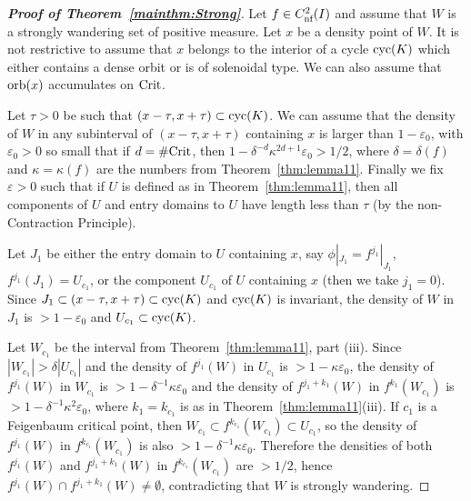 \documentclass[12pt, psamsfonts, reqno]{amsart}
\begin{document}
\begin{proof}[\textbf{Proof of Theorem~\ref{mainthm:Strong}}]
Let $f\in {C^2_{\text{\rm nf}}}(I)$ and assume that $W$ is a strongly wandering
set of positive measure. Let $x$ be a density point of $W$. It is
not restrictive to assume that $x$ belongs to the interior of a
cycle ${\mathop{\rm cyc}\nolimits}(K)$ which either contains a dense orbit \iffalse (and
possibly $K = {\mathop{\rm cyc}\nolimits}(K) = I$)\fi or is of solenoidal type. We can
also assume that ${\mathop{\rm orb}\nolimits}(x)$ accumulates on ${\mathop{\rm Crit}\nolimits}$.

Let $\tau>0$ be such that $(x-\tau,x+\tau)\subset {\mathop{\rm cyc}\nolimits}(K)$. We can
assume that the density of $W$ in any subinterval of
$(x-\tau,x+\tau)$ containing $x$ is larger than $1-{\varepsilon}_0$, with
${\varepsilon}_0>0$ so small that if $d=\#{\mathop{\rm Crit}\nolimits}$, then
$1-\delta^{-d}\kappa^{2d+1}{\varepsilon}_0>1/2$, where $\delta=\delta(f)$
and $\kappa=\kappa(f)$ are the numbers from
Theorem~\ref{thm:lemma11}. Finally we fix ${\varepsilon}>0$ such that if
$U$ is defined as in Theorem~\ref{thm:lemma11}, then all
components of $U$ and entry domains to $U$ have length less than
$\tau$ (by the non-Contraction Principle).

Let $J_1$ be either the entry domain to $U$  containing $x$, say
$\phi|_{J_1}=f^{j_1}|_{J_1}$, $f^{j_1}(J_1)=U_{c_1}$, or the
component $U_{c_1}$ of $U$ containing $x$ (then we take $j_1=0$).
Since $J_1\subset (x-\tau,x+\tau)\subset {\mathop{\rm cyc}\nolimits}(K)$ and ${\mathop{\rm cyc}\nolimits}(K)$ is
invariant,  the density of $W$ in $J_1$ is $>1-{\varepsilon}_0$ and
$U_{c_1}\subset {\mathop{\rm cyc}\nolimits}(K)$.

Let $W_{c_1}$ be the interval from Theorem~\ref{thm:lemma11}, part
(iii). Since $|W_{c_1}| > \delta |U_{c_1}|$ and the density of
$f^{j_1}(W)$ in $U_{c_1}$ is $>1-\kappa{\varepsilon}_0$, the density of
$f^{j_1}(W)$ in $W_{c_1}$ is $>1-\delta^{-1}\kappa{\varepsilon}_0$ and the
density of $f^{j_1+k_1}(W)$ in $f^{k_1}(W_{c_1})$ is
$>1-\delta^{-1}\kappa^2{\varepsilon}_0$, where $k_1 = k_{c_1}$ is as in
Theorem~\ref{thm:lemma11}(iii). If $c_1$ is a Feigenbaum critical
point, then $W_{c_1} \subset f^{k_{c_1}}(W_{c_1}) \subset
U_{c_1}$, so the density of $f^{j_1}(W)$ in $f^{k_{c_1}}(W_{c_1})$
is also $>1-\delta^{-1}\kappa{\varepsilon}_0$. Therefore the densities of
both $f^{j_1}(W)$ and $f^{j_1+k_1}(W)$ in $f^{k_{c_1}}(W_{c_1})$
are $>1/2$, hence  $f^{j_1}(W) \cap f^{j_1+k_1}(W)\neq \emptyset$,
contradicting that $W$ is strongly wandering.


\end{proof}
\end{document}

